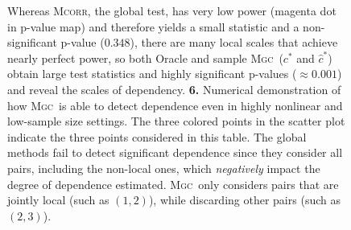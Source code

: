 \documentclass[11pt]{article}
\providecommand{\sct}[1]{{\normalfont\textsc{#1}}}
\newcommand{\G}{c}
\newcommand{\Mgc}{\sct{Mgc}}
\newcommand{\Mcorr}{\sct{Mcorr}}
\begin{document}
\begin{figure}[htbp]
{Whereas \Mcorr, the global test, has very low power (magenta dot in  p-value map) and therefore yields a small statistic and a non-significant p-value ($0.348$),  there are many local scales that achieve nearly perfect power, so both Oracle and sample \Mgc~($\G^{*}$ and $\hat{\G}^{*}$) obtain large test statistics and highly significant p-values ($\approx 0.001$) and reveal the scales of dependency. 
\textbf{6.} Numerical demonstration of how \Mgc~is able to detect dependence even in highly nonlinear and low-sample size settings. The three colored points in the scatter plot indicate the three points considered in this table. 
The global methods fail to detect significant dependence since they consider all pairs, including the non-local ones, which \emph{negatively} impact the degree of dependence estimated.
\Mgc~only considers pairs that are jointly local (such as $(1,2)$), while discarding other pairs (such as $(2,3)$). 
}
\label{f:schematic}
\end{figure}
\end{document}
